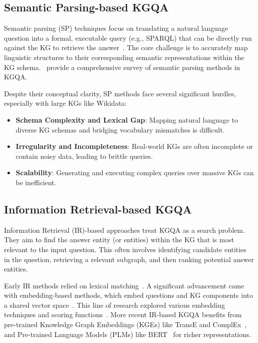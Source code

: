 \subsection{Semantic Parsing-based KGQA}
Semantic parsing (SP) techniques focus on translating a natural language question into a formal, executable query (e.g., SPARQL) that can be directly run against the KG to retrieve the answer~\cite{DBLP:conf/emnlp/SemanticParsing}. The core challenge is to accurately map linguistic structures to their corresponding semantic representations within the KG schema.~\cite{DBLP:conf/akbc/0016P0022} provide a comprehensive survey of semantic parsing methods in KGQA.

Despite their conceptual clarity, SP methods face several significant hurdles, especially with large KGs like Wikidata:
\begin{itemize}
    \item \textbf{Schema Complexity and Lexical Gap}: Mapping natural language to diverse KG schemas and bridging vocabulary mismatches is difficult.
    \item \textbf{Irregularity and Incompleteness}: Real-world KGs are often incomplete or contain noisy data, leading to brittle queries.
    \item \textbf{Scalability}: Generating and executing complex queries over massive KGs can be inefficient.
\end{itemize}

\subsection{Information Retrieval-based KGQA}
Information Retrieval (IR)-based approaches treat KGQA as a search problem. They aim to find the answer entity (or entities) within the KG that is most relevant to the input question. This often involves identifying candidate entities in the question, retrieving a relevant subgraph, and then ranking potential answer entities.

Early IR methods relied on lexical matching~\cite{DBLP:series/irs/Balog18}. A significant advancement came with embedding-based methods, which embed questions and KG components into a shared vector space~\cite{DBLP:conf/emnlp/BordesCW14}. This line of research explored various embedding techniques and scoring functions~\cite{DBLP:conf/acl/DaiLX16, DBLP:conf/www/LukovnikovFLA17, Huang2019KnowledgeGE}. More recent IR-based KGQA benefits from pre-trained Knowledge Graph Embeddings (KGEs) like TransE and ComplEx~\cite{wang2017knowledge}, and Pre-trained Language Models (PLMs) like BERT~\cite{DBLP:conf/naacl/DevlinCLT19} for richer representations.

